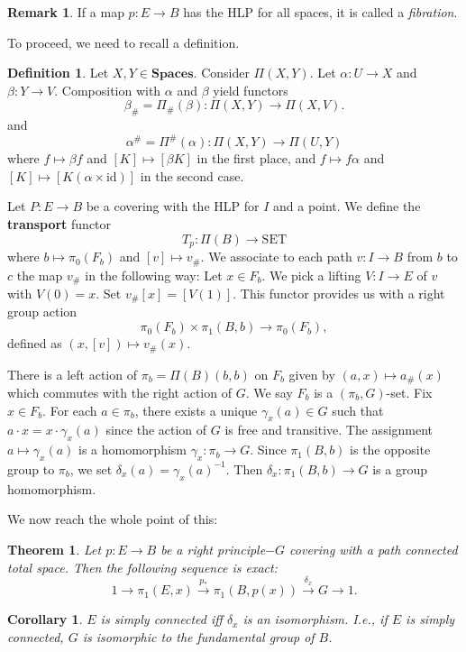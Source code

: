 \documentclass{article}
\newtheorem{theorem}{Theorem}[section]
\newtheorem{cor}{Corollary}[section]
\theoremstyle{definition}
\newtheorem{remark}{Remark}
\newtheorem{defn}{Definition}[section]
\newcommand{\cat}{\mathbf}
\begin{document}
\begin{remark}
If a map $p:E\rightarrow B$ has the HLP for all spaces, it is called a \textit{fibration}.
\end{remark}

To proceed, we need to recall a definition. 
\begin{defn}
Let $X,Y\in\cat{Spaces}.$ Consider $\Pi(X,Y)$. Let $\alpha:U\rightarrow X$ and $\beta:Y\rightarrow V$. Composition with $\alpha$ and $\beta$ yield functors \[\beta_{\#}=\Pi_{\#}(\beta):\Pi(X,Y)\rightarrow\Pi(X,V).\] and 
\[\alpha^{\#}=\Pi^{\#}(\alpha):\Pi(X,Y)\rightarrow\Pi(U,Y)\] where $f\mapsto \beta f$ and $[K]\mapsto[\beta K]$ in the first place, and $f\mapsto f\alpha$ and $[K]\mapsto[K(\alpha\times \text{id})]$ in the second case. 
\end{defn}

Let $P:E\rightarrow B$ be a covering with the HLP for $I$ and a point. We define the \textbf{transport} functor \[T_{p}:\Pi(B)\rightarrow\text{SET} \] where $b\mapsto\pi_{0}(F_{b})$ and $[v]\mapsto v_{\#}$. We associate to each path $v:I\rightarrow B$ from $b$ to $c$ the map $v_{\#}$ in the following way: Let $x\in F_{b}$. We pick a lifting $V:I\rightarrow E$ of $v$ with $V(0)=x$. Set $v_{\#}[x]=[V(1)].$ This functor provides us with a right group action \[\pi_{0}(F_{b})\times\pi_{1}(B,b)\rightarrow\pi_{0}(F_{b}),\] defined as $(x,[v])\mapsto v_{\#}(x).$

There is a left action of $\pi_{b}=\Pi(B)(b,b)$ on $F_{b}$ given by $(a,x)\mapsto a_{\#}(x)$ which commutes with the right action of $G$. We say $F_{b}$ is a $(\pi_{b},G)$-set. Fix $x\in F_{b}$. For each $a\in\pi_{b}$, there exists a unique $\gamma_{x}(a)\in G$ such that $a\cdot x=x\cdot\gamma_{x}(a)$ since the action of $G$ is free and transitive. The assignment $a\mapsto\gamma_{x}(a)$ is a homomorphism $\gamma_{x}:\pi_{b}\rightarrow G$. Since $\pi_{1}(B,b)$ is the opposite group to $\pi_{b}$, we set $\delta_{x}(a)=\gamma_{x}(a)^{-1}$. Then $\delta_{x}:\pi_{1}(B,b)\rightarrow G$ is a group homomorphism. 

We now reach the whole point of this:
\begin{theorem}
Let $p:E\rightarrow B$ be a right principle$-G$ covering with a path connected total space. Then the following sequence is exact:
\[1\rightarrow\pi_{1}(E,x)\xrightarrow{p_{*}}\pi_{1}(B,p(x))\xrightarrow{\delta_{x}}G\rightarrow 1. \]
\end{theorem}
\begin{cor}
$E$ is simply connected iff $\delta_{x}$ is an isomorphism. I.e., if $E$ is simply connected, $G$ is isomorphic to the fundamental group of $B$.
\end{cor}
\end{document}
